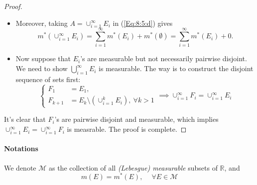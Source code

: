 \begin{proof}
\begin{itemize}
Proceeding these trick similarly, we obtain:
\begin{subequations}
\begin{align}
m^*(A) &=[m^*(A\cap E_n)+m^*(A\cap (\cup_{i=1}^n E_i)^c)]+m^*(A\cap (\cup_{i=1}^{n-1} E_i)]\\
&=
\sum_{\ell=1}^n
m^*(A\cap E_{\ell})
+
m^*(A\cap (\cup_{i=1}^{\ell} E_i)^c)\\
&\ge
\sum_{\ell=1}^n
m^*(A\cap E_{\ell})
+
m^*(A\cap (\cup_{i=1}^\infty E_i)^c)\label{Eq:8:5:c}
\end{align}
for any $n\in\mathbb{N}$, where (\ref{Eq:8:5:c}) is by lower bounding $(\cup_{i=1}^{\ell} E_i)^c\supseteq
(\cup_{i=1}^{\infty} E_i)^c
$.
Taking $n\to\infty$ in (\ref{Eq:8:5:c}), we imply
\begin{align}
m^*(A)&\ge 
\sum_{\ell=1}^\infty
m^*(A\cap E_{\ell})
+
m^*(A\cap (\cup_{i=1}^\infty E_i)^c)\label{Eq:8:5:d}\\
&\ge m^*(\cup_{i=1}^\infty(A\cap E_i))+m^*(A\cap (\cup_{i=1}^\infty E_i)^c)\label{Eq:8:5:e}\\
&=m^*(A\cap(\cup_{i=1}^\infty E_i))+m^*(A\cap (\cup_{i=1}^\infty E_i)^c)\label{Eq:8:5:f}
\end{align}
\end{subequations}
where (\ref{Eq:8:5:e}) is by the countable sub-addictivity of $m^*$.
Therefore, $\cup_{i=1}^\infty E_i$ is measurable.
\item
Moreover, taking $A=\cup_{i=1}^\infty E_i$ in (\ref{Eq:8:5:d}) gives
\[
m^*(\cup_{i=1}^\infty E_i) = \sum_{i=1}^\infty m^*(E_i)+m^*(\emptyset)= \sum_{i=1}^\infty m^*(E_i)+0.
\]
\item
Now suppose that $E_i$'s are measurable but not necessarily pairwise disjoint.
We need to show $\bigcup_{i=1}^\infty E_i$ is measurable. The way is to construct the disjoint sequence of sets first:
\[
\left\{
\begin{aligned}
F_1 &= E_1,\\
F_{k+1}&=E_k\setminus \left(\cup_{i=1}^kE_i\right),\ \forall k>1
\end{aligned}
\right.\implies
\cup_{i=1}^\infty F_i = \cup_{i=1}^\infty E_i
\]
\end{itemize}
It's clear that $F_i$'s are pairwise disjoint and measurable, which implies $\cup_{i=1}^\infty E_i=\cup_{i=1}^\infty F_i$ is measrable. 
The proof is complete.
\end{proof}
\paragraph{Notations}
We denote $\mathcal{M}$ as the collection of all \emph{(Lebesgue) measurable} subsets of $\mathbb{R}$, and
\[
m(E) = m^*(E),\ \quad \forall E\in\mathcal{M}
\]


